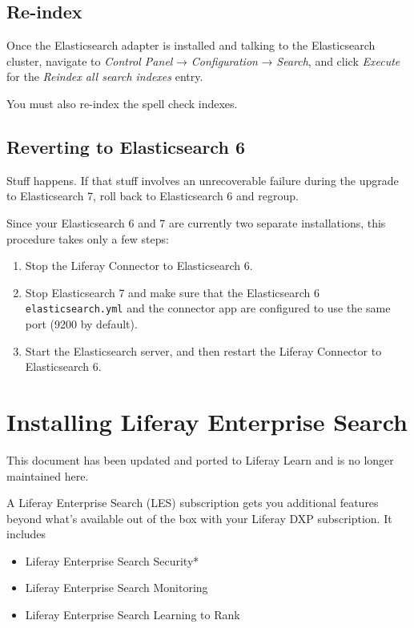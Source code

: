 \section{Re-index}\label{re-index-2}

Once the Elasticsearch adapter is installed and talking to the
Elasticsearch cluster, navigate to \emph{Control Panel} →
\emph{Configuration} → \emph{Search}, and click \emph{Execute} for the
\emph{Reindex all search indexes} entry.

You must also re-index the spell check indexes.

\section{Reverting to Elasticsearch
6}\label{reverting-to-elasticsearch-6}

Stuff happens. If that stuff involves an unrecoverable failure during
the upgrade to Elasticsearch 7, roll back to Elasticsearch 6 and
regroup.

Since your Elasticsearch 6 and 7 are currently two separate
installations, this procedure takes only a few steps:

\begin{enumerate}
\def\labelenumi{\arabic{enumi}.}
\item
  Stop the Liferay Connector to Elasticsearch 6.
\item
  Stop Elasticsearch 7 and make sure that the Elasticsearch 6
  \texttt{elasticsearch.yml} and the connector app are configured to use
  the same port (9200 by default).
\item
  Start the Elasticsearch server, and then restart the Liferay Connector
  to Elasticsearch 6.
\end{enumerate}

\chapter{Installing Liferay Enterprise
Search}\label{installing-liferay-enterprise-search}

{This document has been updated and ported to Liferay Learn and is no
longer maintained here.}

A Liferay Enterprise Search (LES) subscription gets you additional
features beyond what's available out of the box with your Liferay DXP
subscription. It includes

\begin{itemize}
\tightlist
\item
  Liferay Enterprise Search Security*
\item
  Liferay Enterprise Search Monitoring
\item
  Liferay Enterprise Search Learning to Rank
\end{itemize}

